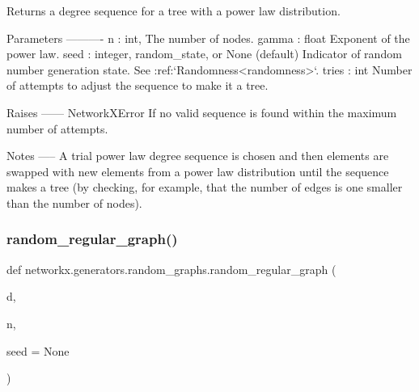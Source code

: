 \begin{DoxyVerb}Returns a degree sequence for a tree with a power law distribution.

Parameters
----------
n : int,
    The number of nodes.
gamma : float
    Exponent of the power law.
seed : integer, random_state, or None (default)
    Indicator of random number generation state.
    See :ref:`Randomness<randomness>`.
tries : int
    Number of attempts to adjust the sequence to make it a tree.

Raises
------
NetworkXError
    If no valid sequence is found within the maximum number of
    attempts.

Notes
-----
A trial power law degree sequence is chosen and then elements are
swapped with new elements from a power law distribution until
the sequence makes a tree (by checking, for example, that the number of
edges is one smaller than the number of nodes).\end{DoxyVerb}
 \mbox{\label{namespacenetworkx_1_1generators_1_1random__graphs_aa86e296ac7fc47fccf09fd74467bd98c}} 
\subsubsection{\texorpdfstring{random\+\_\+regular\+\_\+graph()}{random\_regular\_graph()}}
{\footnotesize\ttfamily def networkx.\+generators.\+random\+\_\+graphs.\+random\+\_\+regular\+\_\+graph (\begin{DoxyParamCaption}\item[{}]{d,  }\item[{}]{n,  }\item[{}]{seed = {\ttfamily None} }\end{DoxyParamCaption})}

